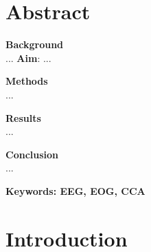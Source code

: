 



\maketitle

\section{Abstract}

\textbf{Background}\\
...
\textbf{Aim}: ...

\textbf{Methods}\\
...

\textbf{Results}\\
...

\textbf{Conclusion}\\
...

\textbf{Keywords: EEG, EOG, CCA}

\section{Introduction}

